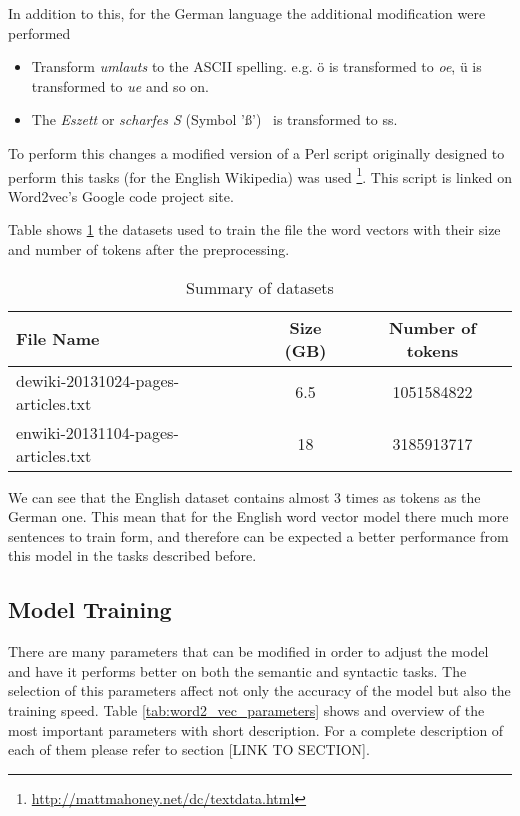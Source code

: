 In addition to this, for the German language the additional modification were
performed
\begin{itemize}
\item Transform \textit{umlauts} to the ASCII spelling.  e.g. \"{o} is
  transformed to \textit{oe},  \"{u} is transformed to \textit{ue}  and so
  on. 
\item The \textit{Eszett} or \textit{scharfes S} (Symbol '\ss') \  is transformed to ss.
\end{itemize}


To perform this changes a modified version of a Perl script originally
designed to perform this tasks (for the English Wikipedia) was used
\footnote{\url{http://mattmahoney.net/dc/textdata.html}}. This script is
linked on Word2vec's Google code project site.

Table shows \ref{tab:summ_dataset_germanword2vec} the datasets used
to train the file the word vectors with their size and number of tokens after
the preprocessing. 
  

 \begin{table}[h]

   \centering
   
   \caption{Summary of datasets} 
   \label{tab:summ_dataset_germanword2vec}
   \small
   \begin{tabular}{ |l|c|c| }
   \hline           
    File Name &  Size (GB) & Number of tokens  \\  \hline           
    dewiki-20131024-pages-articles.txt & 6.5 &   1051584822 \\ 
    enwiki-20131104-pages-articles.txt & 18 &  3185913717  \\
    \hline

\end{tabular}
\end{table}

  

We can see that the English dataset contains almost 3 times as tokens as the
German one. This mean that for the English word vector model  there much more
sentences to train form, and therefore can be expected a better performance
from this model in the tasks described before. 
   
\subsection{Model Training}
\label{experiments:sub:Training}

There are many parameters that can be modified in order to adjust the model
and have it performs better on both the  semantic and syntactic tasks. The
selection of this parameters affect not only the accuracy of the model but
also the training speed.  Table \ref{tab:word2_vec_parameters} shows and
overview of the most important parameters with short description. For a
complete description of each of them please refer to section [LINK TO SECTION]. 


